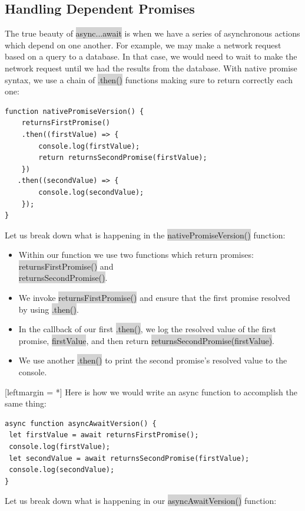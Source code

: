 \documentclass[11pt]{article}
\begin{document}
\subsection{Handling Dependent Promises}
The true beauty of \colorbox{lightgray}{async...await} is when we have a series of asynchronous actions which depend on one another. For example, we may make a network request based on a query to a database. In that case, we would need to wait to make the network request until we had the results from the database. With native promise syntax, we use a chain of  \colorbox{lightgray}{.then()} functions making sure to return correctly each one:
\begin{lstlisting}
function nativePromiseVersion() {
    returnsFirstPromise()
    .then((firstValue) => {
        console.log(firstValue);
        return returnsSecondPromise(firstValue);
    })
   .then((secondValue) => {
        console.log(secondValue);
    });
}
\end{lstlisting}
Let us break down what is happening in the \colorbox{lightgray}{nativePromiseVersion()} function:
\begin{itemize}[leftmargin = *]
\item Within our function we use two functions which return promises: \colorbox{lightgray}{returnsFirstPromise()} and \\
\colorbox{lightgray}{returnsSecondPromise()}.
\item We invoke \colorbox{lightgray}{returnsFirstPromise()} and ensure that the first promise resolved by using \colorbox{lightgray}{.then()}.
\item In the callback of our first \colorbox{lightgray}{.then()}, we log the resolved value of the first promise, \colorbox{lightgray}{firstValue}, and then return \colorbox{lightgray}{returnsSecondPromise(firstValue)}.
\item We use another \colorbox{lightgray}{.then()} to print the second promise’s resolved value to the console.
\end{itemize}[leftmargin = *]
Here is how we would write an async function to accomplish the same thing:
\begin{lstlisting}
async function asyncAwaitVersion() {
 let firstValue = await returnsFirstPromise();
 console.log(firstValue);
 let secondValue = await returnsSecondPromise(firstValue);
 console.log(secondValue);
}
\end{lstlisting}
Let us break down what is happening in our \colorbox{lightgray}{asyncAwaitVersion()} function:
\end{document}
